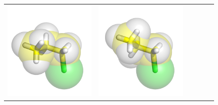 \documentclass{svmult}
\begin{document}
\begin{figure}
\begin{tabular}{cccccc}
\includegraphics[width=\tmpa]{fig/m003-002} & 
\includegraphics[width=\tmpa]{fig/m003-003} & 

\end{tabular}
\end{figure}
\end{document}
